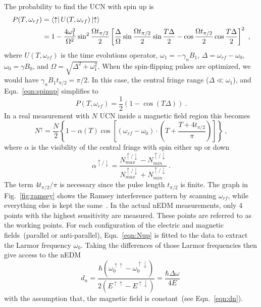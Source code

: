 The probability to find the UCN with spin up is
\begin{align}
  \label{eqn:spinup}
  P(T, \omega_{rf}) &= \bra{\uparrow} U(T, \omega_{rf}) \ket{\uparrow} \\ \nonumber
  &= 1 - \frac{4 \omega_1^2}{\Omega^2} \sin ^2 \frac{\Omega t_{\pi/2}}{2} \left[ \frac{\Delta}{\Omega} \sin  \frac{\Omega t_{\pi/2}}{2} \sin \frac{T\Delta}{2} - \cos  \frac{\Omega t_{\pi/2}}{2} \cos\frac{T\Delta}{2} \right]^2~,
\end{align}
where $U(T, \omega_{rf})$ is the time evolutions operator,
$\omega_1 = - \gamma_n B_1$, $\Delta = \omega_{rf} - \omega_0$,
$\omega_0 = \gamma B_0$, and $\Omega = \sqrt{\Delta^2 +
  \omega_1^2}$. When the spin-flipping pulses are optimized, we would
have $\gamma_n B_1 t_{\pi/2} = \pi / 2$. In this case, the central
fringe range ($\Delta \ll \omega_1$), and Eqn.~\ref{eqn:spinup}
simplifies to
\begin{equation}
  P(T, \omega_{rf}) = \frac{1}{2} \left( 1 - \cos(T\Delta) \right)~.
\end{equation}
In a real measurement with $N$ UCN inside a magnetic field region this
becomes
\begin{equation}
  \label{eqn:Nup}
  N^{\uparrow} = \frac{N}{2} \left\lbrace 1 - \alpha(T) \cos \left[ (\omega_{rf} - \omega_0 ) \cdot \left(T+\frac{T+4t_{\pi/2}}{\pi}\right)\right]\right\rbrace~,
\end{equation}
where $\alpha$ is the visibility of the central fringe with spin
either up or down
\begin{equation}
  \label{eqn:visibility}
  \alpha^{\uparrow /\downarrow} = \frac{N_{max}^{\uparrow /\downarrow} - N_{min}^{\uparrow /\downarrow}}{N_{max}^{\uparrow /\downarrow}+ N_{min}^{\uparrow /\downarrow}}~.
\end{equation}
The term $4t_{\pi/2}/\pi$ is necessary since the pulse length
$t_{\pi/2}$ is finite. The graph in Fig.~\ref{fig:ramsey} shows the
Ramsey interference pattern by scanning $\omega_{rf}$, while
everything else is kept the same~\cite{Schmidt-Wellenburg:2016nfv}. In
the actual nEDM measurements, only 4 points with the highest
sensitivity are measured. These points are referred to as the working
points. For each configuration of the electric and magnetic
fields~(parallel or anti-parallel), Eqn.~\ref{eqn:Nup} is fitted to
the data to extract the Larmor frequency $\omega_0$. Taking the
differences of those Larmor frequencies then give access to the nEDM
\begin{equation}
  \label{eqn:fitteddn}
  d_n = \frac{\hbar (\omega_0 ^{\uparrow \uparrow} - \omega_0 ^{\uparrow \downarrow})}{2(E^{\uparrow \uparrow} - E^{\uparrow \downarrow})} = \frac{\hbar \Delta \omega}{4E}~
\end{equation}
with the assumption that, the magnetic field is constant~(see
Eqn.~\ref{eqn:dn}).


